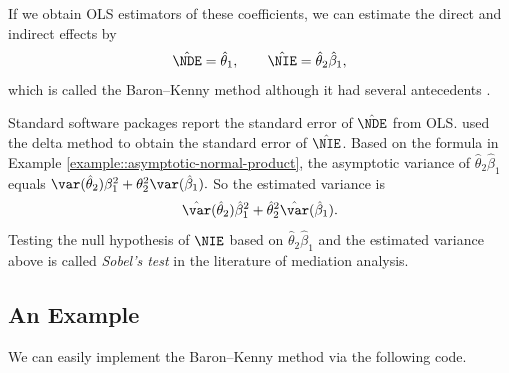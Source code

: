  
If we obtain OLS estimators of these coefficients, we can estimate the direct and indirect effects by
$$
\hat{\NDE} = \hat{\theta}_1,\qquad
\hat{\NIE} = \hat{\theta}_2 \hat{\beta}_1,
$$
which is called the Baron--Kenny method \citep{Judd::1981, baron1986moderator} although it had several antecedents \citep[e.g.,][]{hyman1955survey, alwin1975decomposition, Judd::1981, sobel1982asymptotic}.


Standard software packages report the standard error of $\hat{\NDE}$ from OLS. \citet{sobel1982asymptotic, sobel1986some} used the delta method to obtain the standard error of $\hat{\NIE}$. 
Based on the formula in Example \ref{example::asymptotic-normal-product},  the asymptotic variance of $\hat{\theta}_2  \hat{\beta}_1 $ equals 
$
\var(\hat{\theta}_2)  \beta_1^2 + \theta_2^2 \var(\hat{\beta}_1) .
$
So the estimated variance is
$$
\hat{\var}(\hat{\theta}_2)  \hat{\beta}_1^2 + \hat{\theta}_2^2 \hat{\var}(\hat{\beta}_1) .
$$
Testing the null hypothesis of $\NIE$ based on $\hat{\theta}_2 \hat{\beta}_1$ and the estimated variance above is called {\it Sobel's test} in the literature of mediation analysis. 


 


\subsection{An Example}\label{section::BK-jobs}

We can easily implement the Baron--Kenny method via the following code. 

